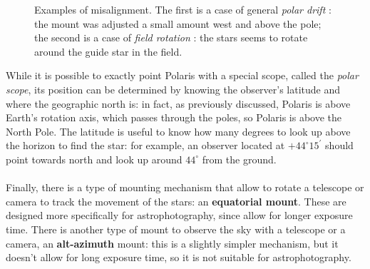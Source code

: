 \documentclass[]{article}
\begin{document}
\begin{figure}[H]
	\centering
	\caption{Examples of misalignment. The first is a case of general \textit{polar drift} \cite{drift}: the mount was adjusted a small amount west and above the pole; the second is a case of \textit{field rotation} \cite{fieldrotation}: the stars seems to rotate around the guide star in the field.\\}
	
\end{figure}

While it is possible to exactly point Polaris with a special scope, called the \textit{polar scope}, its position can be determined by knowing the observer's latitude and where the geographic north is: in fact, as previously discussed, Polaris is above Earth's rotation axis, which passes through the poles, so Polaris is above the North Pole. The latitude is useful to know how many degrees to look up above the horizon to find the star: for example, an observer located at $ +44^{\circ}  15^{\prime} $ should point towards north and look up around $ 44^{\circ}$ from the ground. 
\\
\\
Finally, there is a type of mounting mechanism that allow to rotate a telescope or camera to track the movement of the stars: an \textbf{equatorial mount}. These are designed more specifically for astrophotography, since allow for longer exposure time. There is another type of mount to observe the sky with a telescope or a camera, an \textbf{alt-azimuth} mount: this is a slightly simpler mechanism, but it doesn't allow for long exposure time, so it is not suitable for astrophotography. 
\end{document}

